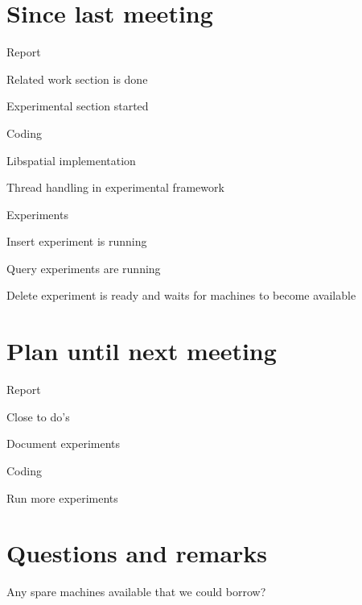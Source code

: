 \documentclass[a4paper,11pt,agenda,chair]{meetingmins}
\begin{document}
\maketitle

\section{Since last meeting}
\begin{items}
\item Report
	\begin{items}
		\item Related work section is done
		\item Experimental section started
	\end{items}
\item Coding
	\begin{items}
		\item Libspatial implementation
		\item Thread handling in experimental framework
	\end{items}
\item Experiments
	\begin{items}
		\item Insert experiment is running
		\item Query experiments are running
		\item Delete experiment is ready and waits for machines to become available
	\end{items}
\end{items}

\section{Plan until next meeting}
\begin{items}
\item Report
	\begin{items}
		\item Close to do's
		\item Document experiments
	\end{items}
\item Coding
	\begin{items}
		\item Run more experiments
	\end{items}
\end{items}

\section{Questions and remarks}
\begin{items}
	\item Any spare machines available that we could borrow?
\end{items}
\end{document}
